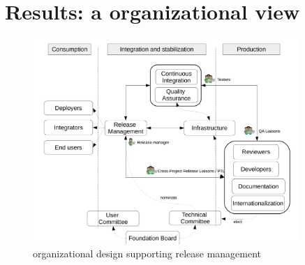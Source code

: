 \documentclass[dvipsnames]{interact}
\theoremstyle{plain}\newtheorem{theorem}{Theorem}[section]
\theoremstyle{definition}
\theoremstyle{remark}
\begin{document}
\section{Results: a organizational view}
\label{sc:tools}




\begin{figure}[!ht]
 \includegraphics[keepaspectratio=true,width=0.9\textwidth]{./release-management-organization.pdf}
 \caption{organizational design supporting release management}
\end{figure}
\end{document}
